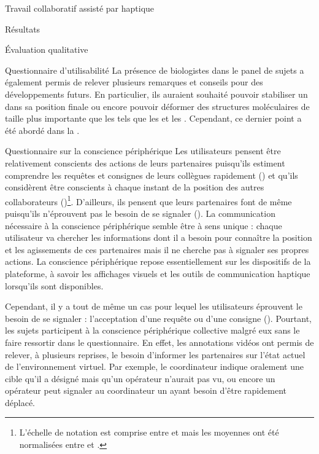 \documentclass[myfrancais,ngerman,english,frenchb]{mythesis}
\begin{document}
\begin{mychapter}{Travail collaboratif assisté par haptique}
\begin{mysection}{Résultats}
\begin{mysubsection}{Évaluation qualitative}
\begin{mysubsubsection}{Questionnaire d'utilisabilité}
					La présence de biologistes dans le panel de sujets a également permis de relever plusieurs remarques et conseils pour des développements futurs.
					En particulier, ils auraient souhaité pouvoir stabiliser un  dans sa position finale ou encore pouvoir déformer des structures moléculaires de taille plus importante que les  tels que les \myhelice* et les \myfeuillet*.
					Cependant, ce dernier point a été abordé dans la .
				\end{mysubsubsection}
				\begin{mysubsubsection}{Questionnaire sur la conscience périphérique}
					Les utilisateurs pensent être relativement conscients des actions de leurs partenaires puisqu'ils estiment comprendre les requêtes et consignes de leurs collègues rapidement () et qu'ils considèrent être conscients à chaque instant de la position des autres collaborateurs ()\footnote{L'échelle de notation est comprise entre  et  mais les moyennes ont été normalisées entre  et .}.
					D'ailleurs, ils pensent que leurs partenaires font de même puisqu'ils n'éprouvent pas le besoin de se signaler ().
					La communication nécessaire à la conscience périphérique semble être à sens unique : chaque utilisateur va chercher les informations dont il a besoin pour connaître la position et les agissements de ces partenaires mais il ne cherche pas à signaler ses propres actions.
					La conscience périphérique repose essentiellement sur les dispositifs de la plateforme, à savoir les affichages visuels et les outils de communication haptique lorsqu'ils sont disponibles.

					Cependant, il y a tout de même un cas pour lequel les utilisateurs éprouvent le besoin de se signaler : l'acceptation d'une requête ou d'une consigne ().
					Pourtant, les sujets participent à la conscience périphérique collective malgré eux sans le faire ressortir dans le questionnaire.
					En effet, les annotations vidéos ont permis de relever, à plusieurs reprises, le besoin d'informer les partenaires sur l'état actuel de l'environnement virtuel.
					Par exemple, le coordinateur indique oralement une cible qu'il a désigné mais qu'un opérateur n'aurait pas vu, ou encore un opérateur peut signaler au coordinateur un  ayant besoin d'être rapidement déplacé.


\end{mysubsubsection}
\end{mysubsection}
\end{mysection}
\end{mychapter}
\end{document}
